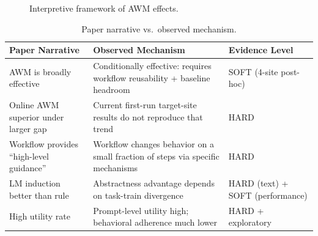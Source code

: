 \documentclass{article}
\begin{document}
\begin{figure}[htbp]
{%
}
\caption{Interpretive framework of AWM effects.}
\label{fig:interpretive-framework}
\end{figure}

{\begin{longtable}[]{@{}
  >{\raggedright\arraybackslash}p{}
  >{\raggedright\arraybackslash}p{}
  >{\raggedright\arraybackslash}p{}@{}}
\caption{Paper narrative vs.~observed mechanism.}\label{tab:paper-narrative-vs-observed-mechanism}\\

\toprule\noalign{}
\begin{minipage}[b]{\linewidth}\raggedright
Paper Narrative
\end{minipage} & \begin{minipage}[b]{\linewidth}\raggedright
Observed Mechanism
\end{minipage} & \begin{minipage}[b]{\linewidth}\raggedright
Evidence Level
\end{minipage} \\
\midrule\noalign{}
\endhead
\bottomrule\noalign{}
\endlastfoot
AWM is broadly effective & Conditionally effective: requires workflow
reusability + baseline headroom & SOFT (4-site post-hoc) \\
Online AWM superior under larger gap & Current first-run target-site
results do not reproduce that trend & HARD \\
Workflow provides ``high-level guidance'' & Workflow changes behavior on
a small fraction of steps via specific mechanisms & HARD \\
LM induction better than rule & Abstractness advantage depends on
task-train divergence & HARD (text) + SOFT (performance) \\
High utility rate & Prompt-level utility high; behavioral adherence much
lower & HARD + exploratory \\
\end{longtable}
}
\end{document}
